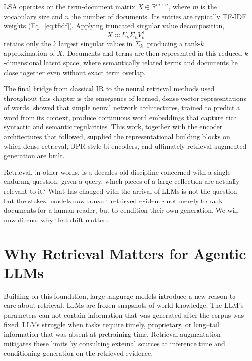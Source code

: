 LSA operates on the term-document matrix $X \in \mathbb{R}^{m \times n}$, where $m$ is the vocabulary size and $n$ the number of documents. Its entries are typically TF-IDF weights (Eq.~\ref{eq:tfidf}). Applying truncated singular value decomposition,
\begin{equation}
X \approx U_k \Sigma_k V_k^{\top}
\label{eq:lsa}
\end{equation}
retains only the $k$ largest singular values in $\Sigma_k$, producing a rank-$k$ approximation of $X$. Documents and terms are then represented in this reduced $k$-dimensional latent space, where semantically related terms and documents lie close together even without exact term overlap.


The final bridge from classical IR to the neural retrieval methods used throughout this chapter is the emergence of learned, dense vector representations of words. \citet{mikolov2013efficient} showed that simple neural network architectures, trained to predict a word from its context, produce continuous word embeddings that capture rich syntactic and semantic regularities. This work, together with the encoder architectures that followed, supplied the representational building blocks on which dense retrieval, DPR-style bi-encoders, and ultimately retrieval-augmented generation are built.

Retrieval, in other words, is a decades-old discipline concerned with a single enduring question: given a query, which pieces of a large collection are actually relevant to it? What has changed with the arrival of LLMs is not the question but the stakes: models now consult retrieved evidence not merely to rank documents for a human reader, but to condition their own generation. We will now discuss  why that shift matters.


\section{Why Retrieval Matters for Agentic LLMs}
Building on this foundation, large language models introduce a new reason to care about retrieval. LLMs are frozen snapshots of world knowledge. The LLM's parameters
can not contain information that was generated after the corpus
was fixed.
LLMs struggle when tasks require timely, proprietary, or long--tail information that was absent at pretraining time. Retrieval augmentation mitigates these limits by consulting external sources at inference time and conditioning generation on the retrieved evidence.

